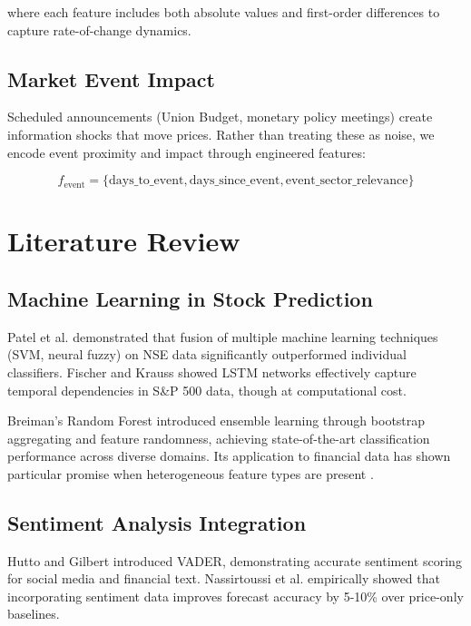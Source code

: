 \documentclass[conference]{IEEEtran}
\begin{document}
where each feature includes both absolute values and first-order differences to capture rate-of-change dynamics.

\subsection{Market Event Impact}

Scheduled announcements (Union Budget, monetary policy meetings) create information shocks that move prices. Rather than treating these as noise, we encode event proximity and impact through engineered features:

\begin{equation}
f_{\text{event}} = \{\text{days\_to\_event}, \text{days\_since\_event}, \text{event\_sector\_relevance}\}
\end{equation}

\section{Literature Review}
\label{sec:literature}

\subsection{Machine Learning in Stock Prediction}

Patel et al. \cite{patel2015predicting} demonstrated that fusion of multiple machine learning techniques (SVM, neural fuzzy) on NSE data significantly outperformed individual classifiers. Fischer and Krauss \cite{fischer2018deep} showed LSTM networks effectively capture temporal dependencies in S\&P 500 data, though at computational cost.

Breiman's Random Forest \cite{breiman2001random} introduced ensemble learning through bootstrap aggregating and feature randomness, achieving state-of-the-art classification performance across diverse domains. Its application to financial data has shown particular promise when heterogeneous feature types are present \cite{kumar2022stock}.

\subsection{Sentiment Analysis Integration}

Hutto and Gilbert \cite{hutto2014vader} introduced VADER, demonstrating accurate sentiment scoring for social media and financial text. Nassirtoussi et al. \cite{nassirtoussi2014} empirically showed that incorporating sentiment data improves forecast accuracy by 5-10\% over price-only baselines.
\end{document}
